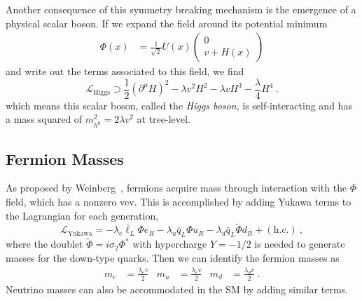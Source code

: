 Another consequence of this symmetry breaking mechanism is the
emergence of a physical scalar boson. If we expand the field around
its potential minimum
\begin{align}
\Phi(x)&=
\frac{1}{\sqrt{2}}U(x)\left(\begin{matrix} 0\\v+H(x)\end{matrix} \right)
\end{align}
and write out the terms associated to this field, we find
\begin{equation}
\mathcal L_{\mathrm{Higgs}} \supset \frac{1}{2}(\partial^{\mu}H)^2 -
\lambda v^2 H^2 - \lambda v H^3 - \frac{\lambda}{4}H^4~.
\end{equation}
which means this scalar boson, called the \emph{Higgs boson}, is self-interacting and has a mass squared of $m^2_{h^0} =
2\lambda v^2$ at tree-level.

\subsection{Fermion Masses}
As proposed by Weinberg~\cite{PhysRevLett.19.1264}, fermions acquire
mass through interaction with the $\Phi$ field, which has a nonzero
vev. This is accomplished by adding Yukawa terms to the Lagrangian for
each generation,
\begin{equation}
\mathcal L_{\mathrm{Yukawa}} = - \lambda_e \bar\ell_L\Phi e_R -
\lambda_u\bar q_L\Phi u_R  - \lambda_d\bar q_L\tilde\Phi d_R + (\mathrm{h.c.})~,
\end{equation}
where the doublet $\tilde\Phi = i\sigma_2\Phi^{\ast}$ with hypercharge $Y=-1/2$ is
needed to generate masses for the down-type quarks. Then we can
identify the fermion masses as
\begin{align}
m_e &= \frac{\lambda_e v}{2}&m_u &= \frac{\lambda_e
                                          v}{2}& m_d &= \frac{\lambda_dv}{2}~.
\end{align}
Neutrino masses can also be accommodated in the SM by adding similar terms.


